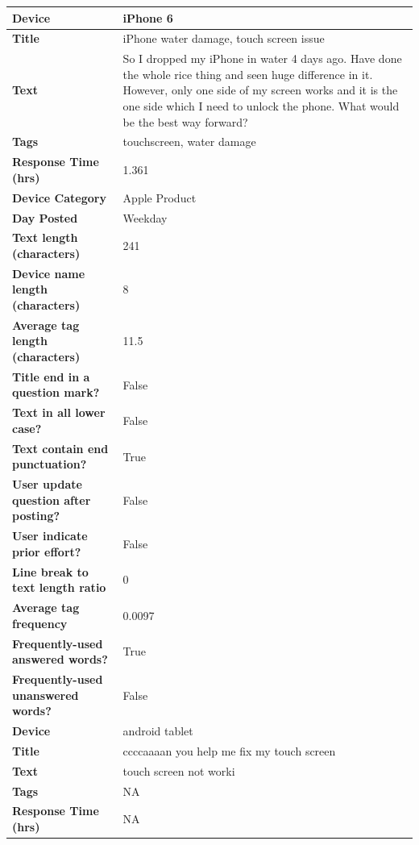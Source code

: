 \documentclass{article}
\begin{document}
\begin{table}[!htbp]
\centering
\begin{tabular}{|L{7cm}|L{7cm}|}
\hline
\textbf{Device} & iPhone 6 \\ \hline
\textbf{Title} & iPhone water damage, touch screen issue \\ \hline
\textbf{Text} & So I dropped my iPhone in water 4 days ago. Have done the whole rice thing and seen huge difference in it. However, only one side of my screen works and it is the one side which I need to unlock the phone. What would be the best way forward? \\ \hline
\textbf{Tags} & touchscreen, water damage \\ \hline
\textbf{Response Time (hrs)} & 1.361 \\ \hline 
\textbf{Device Category} & Apple Product \\ \hline
\textbf{Day Posted} & Weekday \\ \hline
\textbf{Text length (characters)} & 241 \\ \hline
\textbf{Device name length (characters)} & 8 \\ \hline
\textbf{Average tag length (characters)} & 11.5 \\ \hline
\textbf{Title end in a question mark?} & False \\ \hline
\textbf{Text in all lower case?} & False \\ \hline
\textbf{Text contain end punctuation?} & True \\ \hline
\textbf{User update question after posting?} & False \\ \hline
\textbf{User indicate prior effort?} & False \\ \hline
\textbf{Line break to text length ratio} & 0 \\ \hline
\textbf{Average tag frequency} & 0.0097 \\ \hline
\textbf{Frequently-used answered words?} & True \\ \hline
\textbf{Frequently-used unanswered words?} & False \\ \hline \hline
\textbf{Device} & android tablet \\ \hline
\textbf{Title} & ccccaaaan you help me fix my touch screen \\ \hline
\textbf{Text} & touch screen not worki \\ \hline
\textbf{Tags} & NA \\ \hline
\textbf{Response Time (hrs)} & NA \\ \hline 

\end{tabular}
\end{table}
\end{document}
